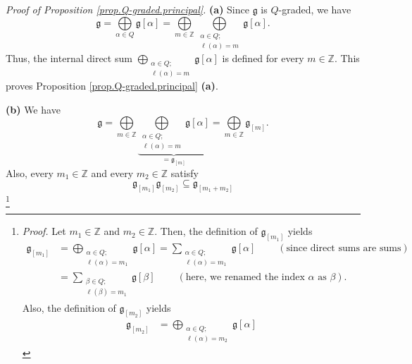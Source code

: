 \documentclass[etingof-lie.tex]{subfiles}
\begin{document}
\begin{verlong}
\textit{Proof of Proposition \ref{prop.Q-graded.principal}.} \textbf{(a)}
Since $\mathfrak{g}$ is $Q$-graded, we have
\[
\mathfrak{g}=\bigoplus\limits_{\alpha\in Q}\mathfrak{g}\left[  \alpha\right]
=\bigoplus\limits_{m\in\mathbb{Z}}\bigoplus\limits_{\substack{\alpha\in
Q;\\\ell\left(  \alpha\right)  =m}}\mathfrak{g}\left[  \alpha\right]  .
\]
Thus, the internal direct sum $\bigoplus\limits_{\substack{\alpha\in
Q;\\\ell\left(  \alpha\right)  =m}}\mathfrak{g}\left[  \alpha\right]  $ is
defined for every $m\in\mathbb{Z}$. This proves Proposition
\ref{prop.Q-graded.principal} \textbf{(a)}.

\textbf{(b)} We have
\[
\mathfrak{g}=\bigoplus\limits_{m\in\mathbb{Z}}\underbrace{\bigoplus
\limits_{\substack{\alpha\in Q;\\\ell\left(  \alpha\right)  =m}}\mathfrak{g}%
\left[  \alpha\right]  }_{=\mathfrak{g}_{\left[  m\right]  }}=\bigoplus
\limits_{m\in\mathbb{Z}}\mathfrak{g}_{\left[  m\right]  }.
\]
Also, every $m_{1}\in\mathbb{Z}$ and every $m_{2}\in\mathbb{Z}$ satisfy%
\[
\mathfrak{g}_{\left[  m_{1}\right]  }\mathfrak{g}_{\left[  m_{2}\right]
}\subseteq\mathfrak{g}_{\left[  m_{1}+m_{2}\right]  }%
\]
\footnote{\textit{Proof.} Let $m_{1}\in\mathbb{Z}$ and $m_{2}\in\mathbb{Z}$.
Then, the definition of $\mathfrak{g}_{\left[  m_{1}\right]  }$ yields
\begin{align*}
\mathfrak{g}_{\left[  m_{1}\right]  }  &  =\bigoplus\limits_{\substack{\alpha
\in Q;\\\ell\left(  \alpha\right)  =m_{1}}}\mathfrak{g}\left[  \alpha\right]
=\sum\limits_{\substack{\alpha\in Q;\\\ell\left(  \alpha\right)  =m_{1}%
}}\mathfrak{g}\left[  \alpha\right]  \ \ \ \ \ \ \ \ \ \ \left(  \text{since
direct sums are sums}\right) \\
&  =\sum\limits_{\substack{\beta\in Q;\\\ell\left(  \beta\right)  =m_{1}%
}}\mathfrak{g}\left[  \beta\right]  \ \ \ \ \ \ \ \ \ \ \left(  \text{here, we
renamed the index }\alpha\text{ as }\beta\right)  .
\end{align*}
Also, the definition of $\mathfrak{g}_{\left[  m_{2}\right]  }$ yields%
\begin{align*}
\mathfrak{g}_{\left[  m_{2}\right]  }  &  =\bigoplus\limits_{\substack{\alpha
\in Q;\\\ell\left(  \alpha\right)  =m_{2}}}\mathfrak{g}\left[  \alpha\right]

\end{align*}}
\end{verlong}
\end{document}
